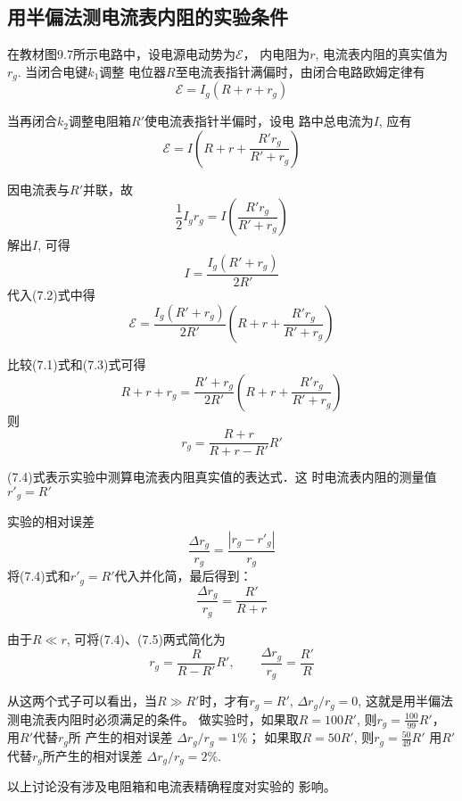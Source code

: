 \subsection{用半偏法测电流表内阻的实验条件}
在教材图9.7所示电路中，设电源电动势为$\mathcal{E}$，
内电阻为$r$, 电流表内阻的真实值为$r_g$. 当闭合电键$k_1$调整
电位器$R$至电流表指针满偏时，由闭合电路欧姆定律有
\begin{equation}
    \mathcal{E}=I_g(R+r+r_g)
\end{equation}

当再闭合$k_2$调整电阻箱$R'$使电流表指针半偏时，设电
路中总电流为$I$, 应有
\begin{equation}
    \mathcal{E}=I\left(R+r+\frac{R'r_g}{R'+r_g}\right)
\end{equation}

因电流表与$R'$并联，故
\begin{equation*}
    \frac{1}{2}I_g r_g=I\left(\frac{R'r_g}{R'+r_g}\right)
\end{equation*}
解出$I$, 可得
\[I=\frac{I_g(R'+r_g)}{2R'}\]
代入(7.2)式中得
\begin{equation}
    \mathcal{E}=\frac{I_g(R'+r_g)}{2R'}\left(R+r+\frac{R'r_g}{R'+r_g}\right)
\end{equation}

比较(7.1)式和(7.3)式可得
\[R+r+r_g=\frac{R'+r_g}{2R'}\left(R+r+\frac{R'r_g}{R'+r_g}\right)\]
则
\begin{equation}
    r_g=\frac{R+r}{R+r-R'}R'
\end{equation}

(7.4)式表示实验中测算电流表内阻真实值的表达式．这
时电流表内阻的测量值$r'_g=R'$

实验的相对误差
\[\frac{\Delta r_g}{r_g}=\frac{|r_g-r'_g|}{r_g}\]
将(7.4)式和$r'_g=R'$代入并化简，最后得到：
\begin{equation}
    \frac{\Delta r_g}{r_g}=\frac{R'}{R+r}
\end{equation}

由于$R\ll r$, 可将(7.4)、(7.5)两式简化为
\[r_g=\frac{R}{R-R'}R',\qquad     \frac{\Delta r_g}{r_g}=\frac{R'}{R}\]

从这两个式子可以看出，当$R\gg R'$时，才有$r_g=R'$,
$\Delta r_g/r_g=0$, 这就是用半偏法测电流表内阻时必须满足的条件。
做实验时，如果取$R=100R'$, 则$r_g=\frac{100}{99}R'$，用$R'$代替$r_g$所
产生的相对误差
$\Delta r_g/r_g=1\%$；
如果取$R=50R'$, 则$r_g=\frac{50}{49}R'$
用$R'$代替$r_g$所产生的相对误差
$\Delta r_g/r_g=2\%$.

以上讨论没有涉及电阻箱和电流表精确程度对实验的
影响。



